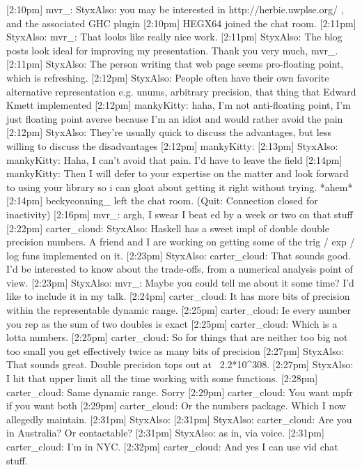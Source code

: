 \documentclass{beamer}
\begin{document}
[2:10pm] mvr_: StyxAlso: you may be interested in http://herbie.uwplse.org/ , and the associated GHC plugin
[2:10pm] HEGX64 joined the chat room.
[2:11pm] StyxAlso: mvr_: That looks like really nice work.
[2:11pm] StyxAlso: The blog posts look ideal for improving my presentation. Thank you very much, mvr_.
[2:11pm] StyxAlso: The person writing that web page seems pro-floating point, which is refreshing.
[2:12pm] StyxAlso: People often have their own favorite alternative representation e.g. unums, arbitrary precision, that thing that Edward Kmett implemented
[2:12pm] mankyKitty: haha, I'm not anti-floating point, I'm just floating point averse because I'm an idiot and would rather avoid the pain
[2:12pm] StyxAlso: They’re usually quick to discuss the advantages, but less willing to discuss the disadvantages
[2:12pm] mankyKitty:
[2:13pm] StyxAlso: mankyKitty: Haha, I can’t avoid that pain. I’d have to leave the field 
[2:14pm] mankyKitty: Then I will defer to your expertise on the matter and look forward to using your library so i can gloat about getting it right without trying. *ahem* 
[2:14pm] beckyconning_ left the chat room. (Quit: Connection closed for inactivity)
[2:16pm] mvr_: argh, I swear I beat ed by a week or two on that stuff
[2:22pm] carter_cloud: StyxAlso: Haskell has a sweet impl of double double precision numbers.  A friend and I are working on getting some of the trig / exp / log funs implemented on it.
[2:23pm] StyxAlso: carter_cloud: That sounds good. I’d be interested to know about the trade-offs, from a numerical analysis point of view.
[2:23pm] StyxAlso: mvr_: Maybe you could tell me about it some time? I’d like to include it in my talk.
[2:24pm] carter_cloud: It has more bits of precision within the representable dynamic range.
[2:25pm] carter_cloud: Ie every number you rep as the sum of two doubles is exact
[2:25pm] carter_cloud: Which is a lotta numbers.
[2:25pm] carter_cloud: So for things that are neither too big not too small you get effectively twice as many bits of precision
[2:27pm] StyxAlso: That sounds great. Double precision tops out at ~2.2*10^308.
[2:27pm] StyxAlso: I hit that upper limit all the time working with some functions.
[2:28pm] carter_cloud: Same dynamic range.  Sorry
[2:29pm] carter_cloud: You want mpfr if you want both 
[2:29pm] carter_cloud: Or the numbers package.  Which I now allegedly maintain.
[2:31pm] StyxAlso:
[2:31pm] StyxAlso: carter_cloud: Are you in Australia? Or contactable?
[2:31pm] StyxAlso: as in, via voice.
[2:31pm] carter_cloud: I'm in NYC.
[2:32pm] carter_cloud: And yes I can use vid chat stuff.
\end{document}
